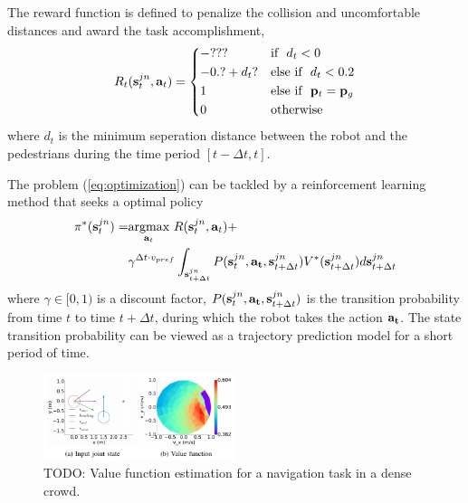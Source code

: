 \documentclass[letterpaper, 10 pt, conference]{ieeeconf}  %
\begin{document}
The reward function is defined to penalize the collision and uncomfortable distances and award the task accomplishment, 
\begin{equation}
    R_t(\bold{s}_t^{jn},\bold{a}_t)= 
\begin{dcases}
    -??? & \text{if} ~~ d_t < 0 \\
    -0.? + d_t? & \text{else if} ~~ d_t < 0.2 \\
    1 & \text{else if} ~~ \bold{p}_t=\bold{p}_g \\
    0 & \text{otherwise} 
\end{dcases}
\end{equation}
where $d_t$ is the minimum seperation distance between the robot and the pedestrians during the time period $[t-\Delta t,t]$. 

The problem (\ref{eq:optimization}) can be tackled by a reinforcement learning method that seeks a optimal policy 
\begin{equation} \label{eq:RL}
\begin{split}
\pi^{*}(\bold{s}_t^{jn}) = & \underset{\bold{a}_t}{\text{argmax}} ~ R(\bold{s}_t^{jn},\bold{a}_t) + \\
& \gamma^{\Delta t \cdot v_{pref}} \int_{\bold{s}_{t+\Delta t}^{jn}} P(\bold{s}_t^{jn},\bold{a_t},\bold{s}_{t+\Delta t}^{jn}) V^*(\bold{s}_{t+\Delta t}^{jn}) d\bold{s}_{t+\Delta t}^{jn}
\end{split}
\end{equation}
where $\gamma \in [0,1)$ is a discount factor, $P(\bold{s}_t^{jn},\bold{a_t},\bold{s}_{t+\Delta t}^{jn}) $ is the transition probability from time $t$ to time $t+\Delta t$, during which the robot takes the action $\bold{a_t}$. The state transition probability can be viewed as a trajectory prediction model for a short period of time. 

\begin{figure} [t]
  \captionsetup{font=small}
  \includegraphics[width=0.5\textwidth]{figures/vf} 
  \caption{TODO: Value function estimation for a navigation task in a dense crowd.}
  \label{fig:overview}
\end{figure}
\end{document}
